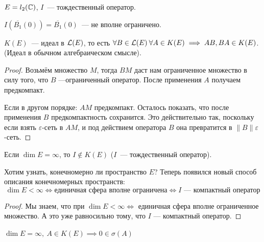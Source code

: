 \begin{unnecessary}
\begin{example}
$E = l_2(\mathbb{C})$, $I$~--- тождественный оператор.

$I(\overline{B_1}(0)) = \overline{B_1}(0)$~--- не вполне ограничено.
\end{example}
\end{unnecessary}

\begin{statement}\label{6.1_st2}
    $K(E)$~--- идеал в $\mathcal{L}(E)$, то есть $\forall B \in \mathcal{L}(E) \: \forall A \in K(E) \implies AB, BA \in K(E)$. (Идеал в обычном алгебраическом смысле).
\end{statement}

\begin{proof}
Возьмём множество $M$, тогда $BM$ даст нам ограниченное множество в силу того, что $B$ ---ограниченный оператор. После применения $A$ получаем предкомпакт.

Если в другом порядке: $AM$ предкомпакт. Осталось показать, что после применения $B$ предкомпактность сохранится. Это действительно так, поскольку если взять $\varepsilon$-сеть в $AM$, и под действием оператора $B$ она превратится в $\|B\|\varepsilon$-сеть.
\end{proof}


\begin{statement}\label{6.1_st3}
Если $\dim E = \infty$, то $I \not \in K(E)$ ($I$~--- тождественный оператор).
\end{statement}

\begin{note}
Хотим узнать, конечномерно ли пространство $E$?
Теперь появился новый способ описания конечномерных пространств:
\[\dim E < \infty \Leftrightarrow \text{единичная сфера вполне ограничена} \Leftrightarrow I\text{~--- компактный оператор}\]
\end{note}

\begin{proof}
    Мы знаем, что при $\dim E < \infty \Leftrightarrow$ единичная сфера вполне ограниченное множество. А это уже равносильно тому, что $I\text{~--- компактный оператор}$.
\end{proof}

\begin{corollary}
    $\dim E = \infty,\: A \in K(E) \implies 0 \in \sigma(A)$
\end{corollary}


